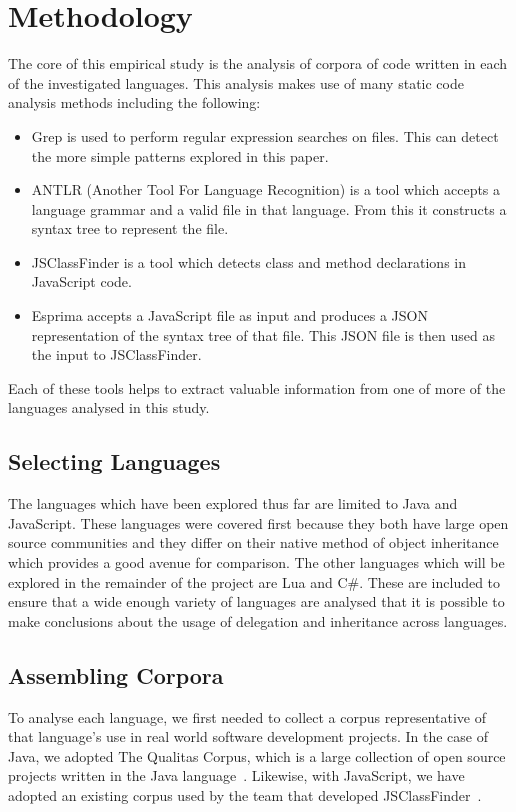 \chapter{Methodology}\label{C:method} 
The core of this empirical study is the analysis of corpora of code written in each of the investigated languages. This analysis makes use of many static code analysis methods including the following:
\begin{itemize}
	\item Grep is used to perform regular expression searches on files. This can detect the more simple patterns explored in this paper.
	\item ANTLR (Another Tool For Language Recognition) is a tool which accepts a language grammar and a valid file in that language. From this it constructs a syntax tree to represent the file.
	\item JSClassFinder is a tool which detects class and method declarations in JavaScript code.
	\item Esprima accepts a JavaScript file as input and produces a JSON representation of the syntax tree of that file. This JSON file is then used as the input to JSClassFinder.
\end{itemize}
Each of these tools helps to extract valuable information from one of more of the languages analysed in this study.

\section{Selecting Languages}
The languages which have been explored thus far are limited to Java and JavaScript. These languages were covered first because they both have large open source communities and they differ on their native method of object inheritance which provides a good avenue for comparison. The other languages which will be explored in the remainder of the project are Lua and C\#. These are included to ensure that a wide enough variety of languages are analysed that it is possible to make conclusions about the usage of delegation and inheritance across languages.

\section{Assembling Corpora}
To analyse each language, we first needed to collect a corpus representative of that language's use in real world software development projects. In the case of Java, we adopted The Qualitas Corpus, which is a large collection of open source projects written in the Java language~\cite{QualitasCorpus}. Likewise, with JavaScript, we have adopted an existing corpus used by the team that developed JSClassFinder~\cite{JSClassFinder}.
\newline

